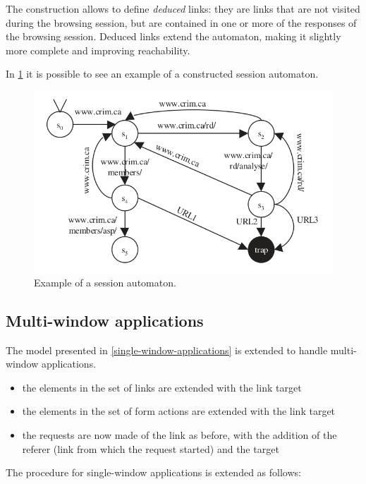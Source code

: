 \documentclass[a4paper,10pt]{article}
\theoremstyle{plain} %
\theoremstyle{definition}
\theoremstyle{remark}
\begin{document}
The construction allows to define \emph{deduced} links: they are links that are not visited during the browsing session, but are contained in one or more of the responses of the browsing session. Deduced links extend the automaton, making it slightly more complete and improving reachability.

In \cref{fig:example-session-automaton} it is possible to see an example of a constructed session automaton.

\begin{figure}[h]
  \includegraphics[width=\textwidth]{img/session_automaton_example.png}
  \caption{Example of a session automaton.}
  \label{fig:example-session-automaton}
\end{figure}

\subsection{Multi-window applications}

The model presented in \cref{single-window-applications} is extended to handle multi-window applications.

\begin{itemize}
  \item the elements in the set of links are extended with the link target
  \item the elements in the set of form actions are extended with the link target
  \item the requests are now made of the link as before, with the addition of the referer (link from which the request started) and the target
\end{itemize}

The procedure for single-window applications is extended as follows:
\end{document}
